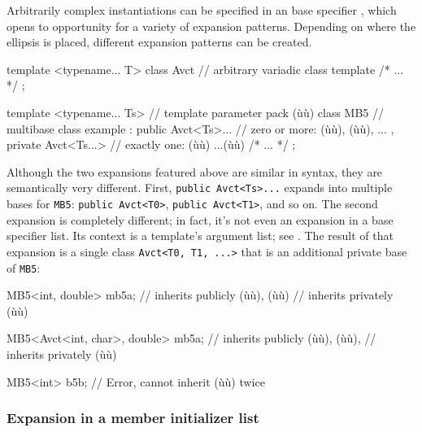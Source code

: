 \noindent Arbitrarily complex instantiations can be specified in an base specifier
, which opens to opportunity for a variety of
expansion patterns. Depending on where the ellipsis is placed, different
expansion patterns can be created.

\begin{emcppslisting}
template <typename... T>
class Avct                 // arbitrary variadic class template
{ /* ... */ };

template <typename... Ts>  // template parameter pack (ù{}ù)
class MB5                  // multibase class example
: public Avct<Ts>...       // zero or more: (ù{}ù), (ù{}ù), ...
, private Avct<Ts...>      // exactly one: (ù{}ù) ...(ù{\codeincomments{>}}ù)
{ /* ... */ };
\end{emcppslisting}
    

\noindent Although the two expansions featured above are similar in syntax, they
are semantically very different. First,
\lstinline!public!~\lstinline!Avct<Ts>...! expands into multiple bases for
\lstinline!MB5!: \lstinline!public!~\lstinline!Avct<T0>!,
\lstinline!public!~\lstinline!Avct<T1>!, and so on. The second expansion is
completely different; in fact, it's not even an expansion in a base
specifier list. Its context is a template's argument list; see
. The result of
that expansion is a single class
\lstinline!Avct<T0,!~\lstinline!T1,!~\lstinline!...>! that is an additional
private base of \lstinline!MB5!:

\begin{emcppslisting}
MB5<int, double> mb5a;
    // inherits publicly (ù{}ù), (ù{}ù)
    // inherits privately (ù{}ù)

MB5<Avct<int, char>, double> mb5a;
    // inherits publicly (ù{}ù), (ù{}ù),
    // inherits privately (ù{}ù)

MB5<int> b5b;
    // Error, cannot inherit (ù{}ù) twice
\end{emcppslisting}
    

\subsubsection[Expansion in a member initializer list]{Expansion in a member initializer list}\label{expansion-in-a-member-initializer-list}

